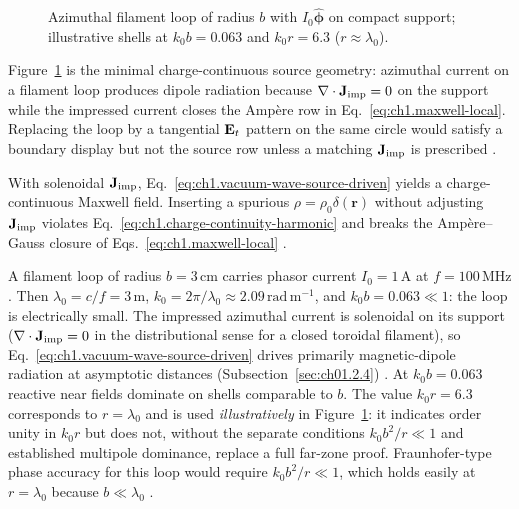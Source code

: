 \begin{figure}[t]
\centering
\VolIPhysFig{\VolIPhysDipoleLoop}
\caption{Azimuthal filament loop of radius $b$ with $I_0\hat{\boldsymbol{\phi}}$ on compact support; illustrative shells at $k_0 b=0.063$ and $k_0 r=6.3$ ($r\approx\lambda_0$).}
\label{fig:ch1.wp-solenoidal-loop}
\end{figure}

Figure~\ref{fig:ch1.wp-solenoidal-loop} is the minimal charge-continuous source geometry: azimuthal
current on a filament loop produces dipole radiation because $\nabla\cdot\mathbf{J}_{\mathrm{imp}}=0$ on the support while
the impressed current closes the Amp\`ere row in Eq.~\eqref{eq:ch1.maxwell-local}. Replacing the
loop by a tangential $\mathbf{E}_t$ pattern on the same circle would satisfy a boundary display but not
the source row unless a matching $\mathbf{J}_{\mathrm{imp}}$ is prescribed \cite{stratton1941,harrington2001}.

With solenoidal \(\mathbf{J}_{\mathrm{imp}}\), Eq.~\eqref{eq:ch1.vacuum-wave-source-driven} yields a charge-continuous Maxwell field. Inserting a spurious \(\rho=\rho_0\delta(\mathbf{r})\) without adjusting \(\mathbf{J}_{\mathrm{imp}}\) violates Eq.~\eqref{eq:ch1.charge-continuity-harmonic} and breaks the Amp\`ere--Gauss closure of Eqs.~\eqref{eq:ch1.maxwell-local} \cite{maxwell1873,stratton1941}.

\begin{example}
\label{ex:ch1.filament-loop}
A filament loop of radius \(b=3\,\mathrm{cm}\) carries phasor current \(I_0=1\,\mathrm{A}\) at \(f=100\,\mathrm{MHz}\). Then \(\lambda_0=c/f=3\,\mathrm{m}\), \(k_0=2\pi/\lambda_0\approx2.09\,\mathrm{rad\,m^{-1}}\), and \(k_0 b=0.063\ll1\): the loop is electrically small. The impressed azimuthal current is solenoidal on its support (\(\nabla\cdot\mathbf{J}_{\mathrm{imp}}=0\) in the distributional sense for a closed toroidal filament), so Eq.~\eqref{eq:ch1.vacuum-wave-source-driven} drives primarily magnetic-dipole radiation at asymptotic distances (Subsection~\ref{sec:ch01.2.4}) \cite{stratton1941,harrington2001}. At \(k_0 b=0.063\) reactive near fields dominate on shells comparable to \(b\). The value \(k_0 r=6.3\) corresponds to \(r=\lambda_0\) and is used \emph{illustratively} in Figure~\ref{fig:ch1.wp-solenoidal-loop}: it indicates order unity in \(k_0 r\) but does not, without the separate conditions \(k_0 b^2/r\ll1\) and established multipole dominance, replace a full far-zone proof. Fraunhofer-type phase accuracy for this loop would require \(k_0 b^2/r\ll1\), which holds easily at \(r=\lambda_0\) because \(b\ll\lambda_0\) \cite{stratton1941,jackson1999}.
\end{example}

